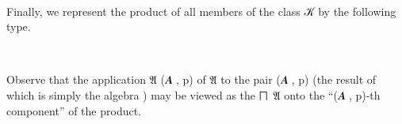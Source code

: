 \ccpad
\begin{code}
\>[0][@{}l@{\AgdaIndent{0}}]%
\>[1]\AgdaSpace{}%
\AgdaSymbol{:}\AgdaSpace{}%
\AgdaSpace{}%
\AgdaSpace{}%
\AgdaSpace{}%
\AgdaSpace{}%
\<%
\\
%
\>[1]\AgdaSpace{}%
\AgdaSymbol{=}\AgdaSpace{}%
\AgdaSpace{}%
\AgdaSymbol{(}\AgdaSpace{}%
\AgdaSymbol{:}\AgdaSpace{}%
\AgdaSymbol{)}\AgdaSpace{}%
\AgdaSpace{}%
\AgdaSpace{}%
\AgdaSpace{}%
\<%
\end{code}
\ccpad
Finally, we represent the product of all members of the class \ab 𝒦 by the following type.
\ccpad
\begin{code}%
\>[0][@{}l@{\AgdaIndent{0}}]%
\>[1]\AgdaSpace{}%
\AgdaSymbol{:}\AgdaSpace{}%
\AgdaSpace{}%
\AgdaSymbol{(}\AgdaSpace{}%
\AgdaSymbol{)}\AgdaSpace{}%
\<%
\\
%
\>[1]\AgdaSpace{}%
\AgdaSymbol{=}\AgdaSpace{}%
\AgdaSpace{}%
\<%
\end{code}
\ccpad
Observe that the application \af 𝔄 (\ab 𝑨 , \ab p) of \af 𝔄 to the pair (\ab 𝑨 , \ab p) (the result of which is simply the algebra ) may be viewed as the  \af ⨅~\af 𝔄 onto the ``(\ab 𝑨 , \ab p)-th component'' of the product.





